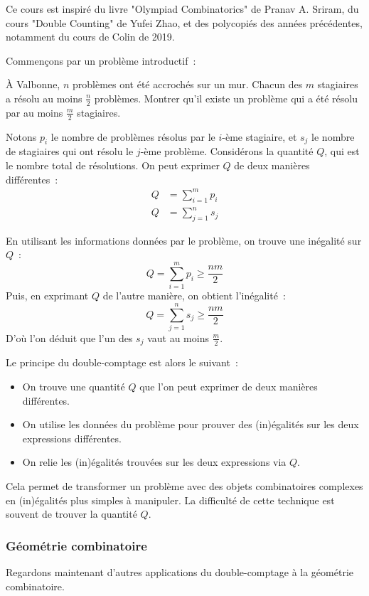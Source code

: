 Ce cours est inspiré du livre "Olympiad Combinatorics" de Pranav A. Sriram, du cours "Double Counting" de Yufei Zhao, et des polycopiés des années précédentes, notamment du cours de Colin de 2019.

Commençons par un problème introductif~:
\begin{exo}
	À Valbonne, $n$ problèmes ont été accrochés sur un mur. Chacun des $m$ stagiaires a résolu au moins $\frac{n}2$ problèmes. Montrer qu'il existe un problème qui a été résolu par au moins $\frac{m}2$ stagiaires.
\end{exo}
\begin{sol}
	Notons $p_i$ le nombre de problèmes résolus par le $i$-ème stagiaire, et $s_j$ le nombre de stagiaires qui ont résolu le $j$-ème problème.
	Considérons la quantité $Q$, qui est le nombre total de résolutions.
	On peut exprimer $Q$ de deux manières différentes~:
	\begin{align*}
		Q &= \sum_{i = 1}^m p_i \\
		Q &= \sum_{j = 1}^n s_j
	\end{align*}
	
	En utilisant les informations données par le problème, on trouve une inégalité sur $Q$~:
	$$Q = \sum_{i = 1}^m p_i \geq \frac{nm}2$$
	Puis, en exprimant $Q$ de l'autre manière, on obtient l'inégalité~:
	$$Q = \sum_{j = 1}^n s_j \geq \frac{nm}2$$
	D'où l'on déduit que l'un des $s_j$ vaut au moins $\frac{m}2$.
\end{sol}

Le principe du double-comptage est alors le suivant~:
\begin{itemize}
\item On trouve une quantité $Q$ que l'on peut exprimer de deux manières différentes.
\item On utilise les données du problème pour prouver des (in)égalités sur les deux expressions différentes.
\item On relie les (in)égalités trouvées sur les deux expressions via $Q$.
\end{itemize}
Cela permet de transformer un problème avec des objets combinatoires complexes en (in)égalités plus simples à manipuler. La difficulté de cette technique est souvent de trouver la quantité $Q$.

\subsubsection{Géométrie combinatoire}
Regardons maintenant d'autres applications du double-comptage à la géométrie combinatoire.

